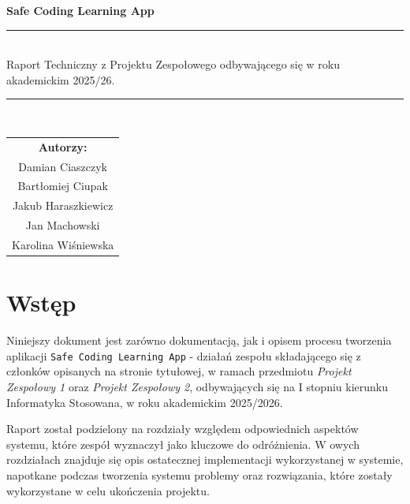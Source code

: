\documentclass[12pt,a4paper]{article}
\begin{document}
\begin{titlepage}
    \centering
    \vspace*{\fill}

    {\Huge\bfseries\color{primary} Safe Coding Learning App}\\[0.5em]
    \rule{\textwidth}{1.5pt}\\[3em]

    {\Large\color{gray} Raport Techniczny z Projektu Zespołowego odbywającego się w roku akademickim 2025/26.}\\[3em]

    \rule{\textwidth}{0.5pt}\\[3em]

    
    \begin{tabular}{c}
        \textbf{Autorzy:} \\
        Damian Ciaszczyk \\
        Bartłomiej Ciupak \\
        Jakub Haraszkiewicz \\
        Jan Machowski \\
        Karolina Wiśniewska \\
    \end{tabular}

    \vspace*{\fill}
\end{titlepage}



\tableofcontents
\newpage

\section{Wstęp}

Niniejszy dokument jest zarówno dokumentacją, jak i opisem procesu tworzenia aplikacji \texttt{Safe Coding Learning App} - działań zespołu składającego się z członków opisanych na stronie tytułowej, w ramach przedmiotu \emph{Projekt Zespołowy 1} oraz \emph{Projekt Zespołowy 2}, odbywających się na I stopniu kierunku Informatyka Stosowana, w roku akademickim 2025/2026.

Raport został podzielony na rozdziały względem odpowiednich aspektów systemu, które zespół wyznaczył jako kluczowe do odróżnienia. W owych rozdziałach znajduje się opis ostatecznej implementacji wykorzystanej w systemie, napotkane podczas tworzenia systemu problemy oraz rozwiązania, które zostały wykorzystane w celu ukończenia projektu.
\end{document}
